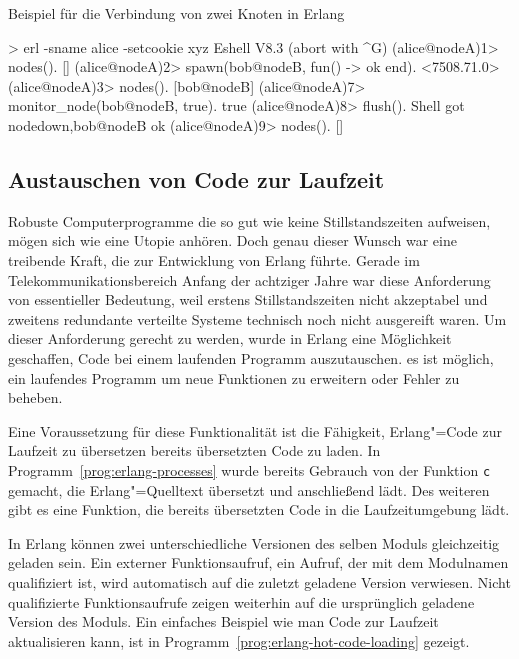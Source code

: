 \begin{program}[!hbt]
\caption{Beispiel für die Verbindung von zwei Knoten in Erlang}
\label{prog:erlang-distributed}
\begin{ErlangCode}
> erl -sname alice -setcookie xyz
Eshell V8.3  (abort with ^G)
(alice@nodeA)1> nodes().
[]
(alice@nodeA)2> spawn(bob@nodeB, fun() -> ok end).
<7508.71.0>
(alice@nodeA)3> nodes().
[bob@nodeB]
(alice@nodeA)7> monitor_node(bob@nodeB, true).
true
(alice@nodeA)8> flush(). %
Shell got {nodedown,bob@nodeB}
ok
(alice@nodeA)9> nodes().
[]
\end{ErlangCode}
\end{program}

\subsection{Austauschen von Code zur Laufzeit}

Robuste Computerprogramme die so gut wie keine Stillstandszeiten aufweisen, mögen sich wie eine Utopie anhören. Doch genau dieser Wunsch war eine treibende Kraft, die zur Entwicklung von Erlang führte. Gerade im Telekommunikationsbereich Anfang der achtziger Jahre war diese Anforderung von essentieller Bedeutung, weil erstens Stillstandszeiten nicht akzeptabel und zweitens redundante verteilte Systeme technisch noch nicht ausgereift waren. Um dieser Anforderung gerecht zu werden, wurde in Erlang eine Möglichkeit geschaffen, Code bei einem laufenden Programm auszutauschen. \Dah es ist möglich, ein laufendes Programm um neue Funktionen zu erweitern oder Fehler zu beheben.

Eine Voraussetzung für diese Funktionalität ist die Fähigkeit, Erlang"=Code zur Laufzeit zu übersetzen \bzw bereits übersetzten Code zu laden. In Programm~\ref{prog:erlang-processes} wurde bereits Gebrauch von der Funktion \lstinline{c} gemacht, die Erlang"=Quelltext übersetzt und anschließend lädt. Des weiteren gibt es eine Funktion, die bereits übersetzten Code in die Laufzeitumgebung lädt.

In Erlang können zwei unterschiedliche Versionen des selben Moduls gleichzeitig geladen sein. Ein externer Funktionsaufruf, \dah ein Aufruf, der mit dem Modulnamen qualifiziert ist, wird automatisch auf die zuletzt geladene Version verwiesen. Nicht qualifizierte Funktionsaufrufe zeigen weiterhin auf die ursprünglich geladene Version des Moduls. Ein einfaches Beispiel wie man Code zur Laufzeit aktualisieren kann, ist in Programm~\ref{prog:erlang-hot-code-loading} gezeigt.

